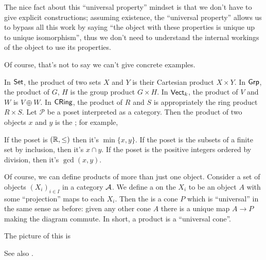 The nice fact about this ``universal property'' mindset
is that we don't have to give explicit constructions; assuming existence,
the ``universal property'' allows us to bypass all this work by saying
``the object with these properties is unique up to unique isomorphism'',
thus we don't need to understand the internal workings of the object
to use its properties.

Of course, that's not to say we can't give concrete examples.
\begin{example}
	\listhack
	\begin{enumerate}[(a)]
		\ii In $\catname{Set}$, the product of two sets
		$X$ and $Y$ is their Cartesian product $X \times Y$.
		\ii In $\catname{Grp}$, the product of $G$, $H$
		is the group product $G \times H$.
		\ii In $\catname{Vect}_k$, the product
		of $V$ and $W$ is $V \oplus W$.
		\ii In $\catname{CRing}$, the product
		of $R$ and $S$ is appropriately the ring product $R \times S$.
		\ii Let $\mathcal P$ be a poset interpreted as a category.
		Then the product of two objects $x$ and $y$
		is the ; for example,
		\begin{itemize}
			\ii If the poset is $(\RR, \le)$ then it's $\min\{x,y\}$.
			\ii If the poset is the subsets
			of a finite set by inclusion,
			then it's $x \cap y$.
			\ii If the poset is the positive integers ordered by division,
			then it's $\gcd(x,y)$.
		\end{itemize}
	\end{enumerate}
\end{example}

Of course, we can define products of more than just one object.
Consider a set of objects $(X_i)_{i \in I}$ in a category $\AA$.
We define a  on the $X_i$ to be an object $A$
with some ``projection'' maps to each $X_i$.
Then the  is a cone $P$ which is ``universal'' in the same sense as before:
given any other cone $A$ there is a unique map $A \to P$ making the diagram commute.
In short, a product is a ``universal cone''.

The picture of this is
\begin{center}
\end{center}
See also .

